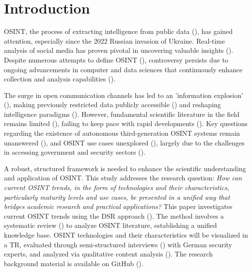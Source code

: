 \documentclass[10pt]{article}
\begin{document}
\section{Introduction} \label{sec:introduction}

OSINT, the process of extracting intelligence from public data (\cite{DosPassos.2017}), has gained attention, especially since the 2022 Russian invasion of Ukraine. Real-time analysis of social media has proven pivotal in uncovering valuable insights (\cite{SmithBoyle.24.07.2023}). Despite numerous attempts to define OSINT (\cite{PastorGalindo.2020, Yogish.2021}), controversy persists due to ongoing advancements in computer and data sciences that continuously enhance collection and analysis capabilities (\cite{Ghioni.2023}).

The surge in open communication channels has led to an 'information explosion' (\cite{Hwang.2022}), making previously restricted data publicly accessible (\cite{Williams.2018}) and reshaping intelligence paradigms (\cite{Dokman.2020}). However, fundamental scientific literature in the field remains limited (\cite{HerreraCubides.2020}), failing to keep pace with rapid developments (\cite{Ghioni.2023, Williams.2018}). Key questions regarding the existence of autonomous third-generation OSINT systems remain unanswered (\cite{Ghioni.2023, PastorGalindo.2020}), and OSINT use cases unexplored (\cite{AlKilani.2021, Ghioni.2023}), largely due to the challenges in accessing government and security sectors (\cite{HerreraCubides.2020, PastorGalindo.2019}).

A robust, structured framework is needed to enhance the scientific understanding and application of OSINT. This study addresses the research question: \textit{How can current OSINT trends, in the form of technologies and their characteristics, particularly maturity levels and use cases, be presented in a unified way that bridges academic research and practical applications?} This paper investigates current OSINT trends using the DSR approach (\cite{Peffers.2007}). The method involves a systematic review (\cite{Cleven.2009}) to analyze OSINT literature, establishing a unified knowledge base.
OSINT technologies and their characteristics will be visualized in a TR, evaluated through semi-structured interviews (\cite{Glaser.2009}) with German security experts, and analyzed via qualitative content analysis (\cite{Billings.1997}). The research background material is available on GitHub (\cite{kayser2024}).
\end{document}
